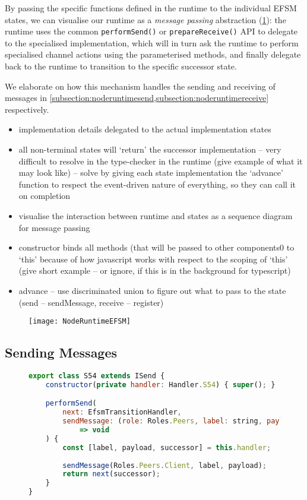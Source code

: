 By passing the specific functions defined in the runtime
to the individual EFSM states, we can visualise our runtime
as a \textit{message passing} abstraction 
(\cref{fig:noderuntimeefsm}): the runtime uses the common
\texttt{performSend()} or \texttt{prepareReceive()} API
to delegate to the specialised implementation, which will in turn
ask the runtime to perform specialised channel actions using
the parameterised methods, and finally delegate back to
the runtime to transition to the specific successor state.

We elaborate on how this mechanism
handles the sending and receiving of messages in
\cref{subsection:noderuntimesend,subsection:noderuntimereceive}
respectively.

\begin{itemize}
\item implementation details delegated to the actual implementation states
\item all non-terminal states will `return' the successor implementation -- very difficult to resolve in the type-checker in the runtime (give example of what it may look like) -- solve by giving each state implementation the `advance' function to respect the event-driven nature of everything, so they can call it on completion
\item visualise the interaction between runtime and states as a sequence diagram for message passing
\item constructor binds all methods (that will be passed to other components0 to `this' because of how javascript works with respect to the scoping of `this' (give short example -- or ignore, if this is in the background for typescript)
\item advance -- use discriminated union to figure out what to pass to the state (send -- sendMessage, receive -- register)
\end{itemize}

\begin{figure}[!ht]
\centering
\texttt{[image: NodeRuntimeEFSM]}
\label{fig:noderuntimeefsm}
\end{figure}

\subsection{Sending Messages}
\label{subsection:noderuntimesend}

\begin{figure}[!h]
\begin{lstlisting}[language=javascript,tabsize=2]
export class S54 extends ISend {
	constructor(private handler: Handler.S54) { super(); }

	performSend(
		next: EfsmTransitionHandler,
		sendMessage: (role: Roles.Peers, label: string, payload: any[])
			=> void
	) {
		const [label, payload, successor] = this.handler;
		
		sendMessage(Roles.Peers.Client, label, payload);
		return next(successor);
	}
}
\end{lstlisting}
\label{lst:nodesend}
\end{figure}

